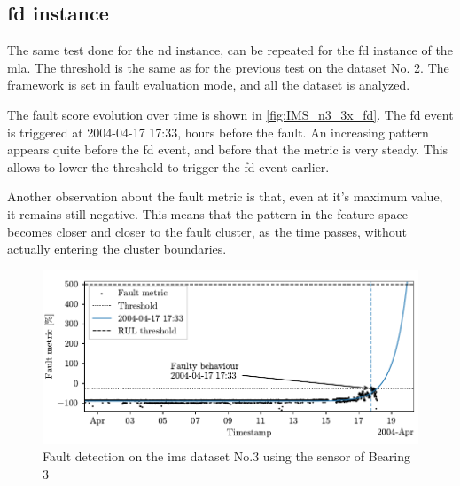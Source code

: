 \subsection{\gls{fd} instance}

The same test done for the \gls{nd} instance, can be repeated for the \gls{fd} instance of the \gls{mla}. The threshold is the same as for the previous test on the dataset No. 2. The framework is set in fault evaluation mode, and all the dataset is analyzed. 

The fault score evolution over time is shown in \autoref{fig:IMS_n3_3x_fd}. 
The \gls{fd} event is triggered at 2004-04-17 17:33, hours before the fault.
An increasing pattern appears quite before the \gls{fd} event, and before that the metric is very steady. This allows to lower the threshold to trigger the \gls{fd} event earlier.

Another observation about the fault metric is that, even at it's maximum value, it remains still negative. This means that the pattern in the feature space becomes closer and closer to the fault cluster, as the time passes, without actually entering the cluster boundaries.

\begin{figure}
    \centering
    \includegraphics{images/IMS/Test03/FD.pdf}
    \caption{Fault detection on the \gls{ims} dataset No.3 using the sensor of Bearing 3}
    \label{fig:IMS_n3_3x_fd}
\end{figure}